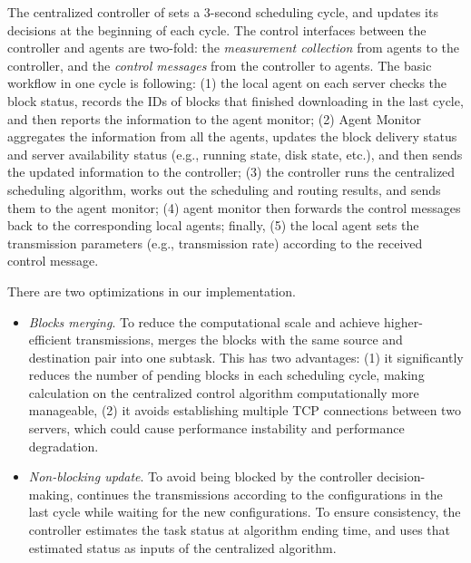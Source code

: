 The centralized controller of \name sets a 3-second scheduling cycle, and updates its decisions at the beginning of each cycle. The control interfaces between the controller and agents are two-fold: the {\em measurement collection} from agents to the controller, and the {\em control messages} from the controller to agents. The basic workflow in one cycle is following: (1) the local agent on each server checks the block status, records the IDs of blocks that finished downloading in the last cycle, and then reports the information to the agent monitor; (2) Agent Monitor aggregates the information from all the agents, updates the block delivery status and server availability status (e.g., running state, disk state, etc.), and then sends the updated information to the controller; (3) the controller runs the centralized scheduling algorithm, works out the scheduling and routing results, and sends them to the agent monitor; (4) agent monitor then forwards the control messages back to the corresponding local agents; finally, (5) the local agent sets the transmission parameters (e.g., transmission rate) according to the received control message.

There are two optimizations in our implementation.
\begin{itemize}
\item \emph{Blocks merging}.
To reduce the computational scale and achieve higher-efficient transmissions, \name merges the blocks with the same source and destination pair into one subtask.
This has two advantages: (1) it significantly reduces the number of pending blocks in each scheduling cycle, making calculation on the centralized control algorithm computationally more manageable,
(2) it avoids establishing multiple TCP connections between two servers, which could cause performance instability and  performance degradation.
\item \emph{Non-blocking update}. To avoid being blocked by the controller decision-making, \name continues the transmissions according to the configurations in the last cycle while waiting for the new configurations. To ensure consistency, the controller estimates the task status at algorithm ending time, and uses that estimated status as inputs of the centralized algorithm.
\end{itemize}

